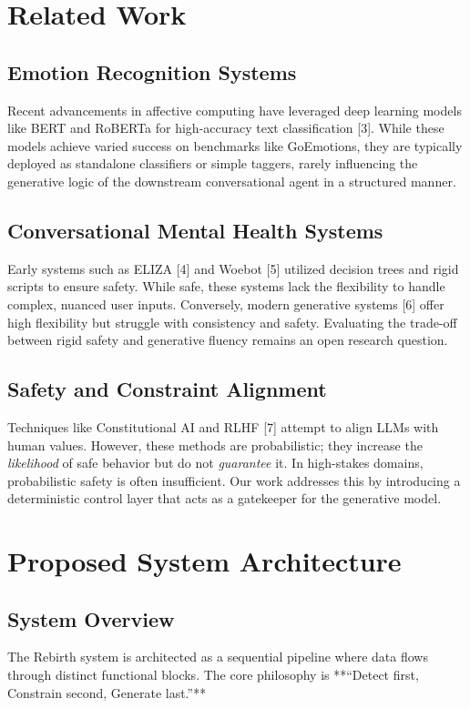 \documentclass[conference]{IEEEtran}
\begin{document}
\section{Related Work}

\subsection{Emotion Recognition Systems}
Recent advancements in affective computing have leveraged deep learning models like BERT and RoBERTa for high-accuracy text classification [3]. While these models achieve varied success on benchmarks like GoEmotions, they are typically deployed as standalone classifiers or simple taggers, rarely influencing the generative logic of the downstream conversational agent in a structured manner.

\subsection{Conversational Mental Health Systems}
Early systems such as ELIZA [4] and Woebot [5] utilized decision trees and rigid scripts to ensure safety. While safe, these systems lack the flexibility to handle complex, nuanced user inputs. Conversely, modern generative systems [6] offer high flexibility but struggle with consistency and safety. Evaluating the trade-off between rigid safety and generative fluency remains an open research question.

\subsection{Safety and Constraint Alignment}
Techniques like Constitutional AI and RLHF [7] attempt to align LLMs with human values. However, these methods are probabilistic; they increase the \textit{likelihood} of safe behavior but do not \textit{guarantee} it. In high-stakes domains, probabilistic safety is often insufficient. Our work addresses this by introducing a deterministic control layer that acts as a gatekeeper for the generative model.

\section{Proposed System Architecture}

\subsection{System Overview}
The Rebirth system is architected as a sequential pipeline where data flows through distinct functional blocks. The core philosophy is **``Detect first, Constrain second, Generate last.''**
\end{document}
